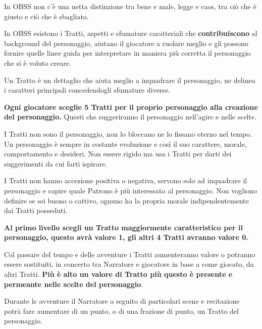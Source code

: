 \begin{multicols}{2}

In OBSS non c'è una netta distinzione tra bene e male, legge e caos, tra ciò che è giusto e ciò che è sbagliato.

In OBSS esistono i Tratti, aspetti e sfumature caratteriali che \textbf{contribuiscono} al background del personaggio, aiutano il giocatore a ruolare meglio e gli possono fornire quelle linee guida per interpretare in maniera più corretta il personaggio che si è voluto creare.

Un Tratto è un dettaglio che aiuta meglio a inquadrare il personaggio, ne delinea i caratteri principali concedendogli sfumature diverse.

\textbf{Ogni giocatore sceglie 5 Tratti per il proprio personaggio alla creazione del personaggio.} Questi che suggeriranno il personaggio nell'agire e nelle scelte.

\medskip

\begin{changemargin}{0.3cm}{0.3cm}\begin{tcolorbox}[title = Scegliere i Tratti] %
I Tratti non sono il personaggio, non lo bloccano ne lo fissano eterno nel tempo. Un personaggio è sempre in costante evoluzione e così il suo carattere, morale, comportamento e desideri. Non essere rigido ma usa i Tratti per darti dei suggerimenti da cui farti ispirare.
\end{tcolorbox}\end{changemargin}

\medskip

I Tratti non hanno accezione positiva o negativa, servono solo ad inquadrare il personaggio e capire quale Patrono è più interessato al personaggio. Non vogliono definire se sei buono o cattivo, ognuno ha la propria morale indipendentemente dai Tratti posseduti.

\textbf{Al primo livello scegli un Tratto maggiormente caratteristico per il personaggio, questo avrà valore 1, gli altri 4 Tratti avranno valore 0.}

Col passare del tempo e delle avventure i Tratti aumenteranno valore o potranno essere sostituiti, in concerto tra Narratore e giocatore in base a come giocato, da altri Tratti. \textbf{Più è alto un valore di Tratto più questo è presente e permeante nelle scelte del personaggio}.

Durante le avventure il Narratore a seguito di particolari scene e recitazione potrà fare aumentare di un punto, o di una frazione di punto, un Tratto del personaggio.


\end{multicols}
